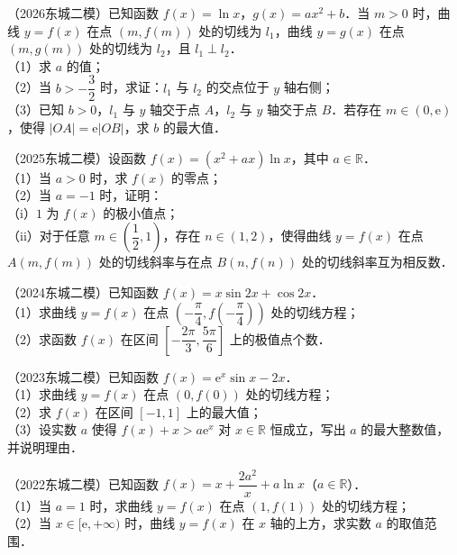 \begin{example}
（2026东城二模）已知函数 $f(x)=\ln x$，$g(x)=ax^2+b$．当 $m>0$ 时，曲线 $y=f(x)$ 在点 $(m,f(m))$ 处的切线为 $l_1$，曲线 $y=g(x)$ 在点 $(m,g(m))$ 处的切线为 $l_2$，且 $l_1\perp l_2$．\\
（1）求 $a$ 的值；\\
（2）当 $b>-\dfrac32$ 时，求证：$l_1$ 与 $l_2$ 的交点位于 $y$ 轴右侧；\\
（3）已知 $b>0$，$l_1$ 与 $y$ 轴交于点 $A$，$l_2$ 与 $y$ 轴交于点 $B$．若存在 $m\in(0,\mathrm{e})$，使得 $|OA|=\mathrm{e}|OB|$，求 $b$ 的最大值．
\end{example}

\begin{example}
（2025东城二模）设函数 $f(x)=(x^2+ax)\ln x$，其中 $a\in\mathbb{R}$．\\
（1）当 $a>0$ 时，求 $f(x)$ 的零点；\\
（2）当 $a=-1$ 时，证明：\\
（i）$1$ 为 $f(x)$ 的极小值点；\\
（ii）对于任意 $m\in\left(\dfrac12,1\right)$，存在 $n\in(1,2)$，使得曲线 $y=f(x)$ 在点 $A(m,f(m))$ 处的切线斜率与在点 $B(n,f(n))$ 处的切线斜率互为相反数．
\end{example}

\begin{example}
（2024东城二模）已知函数 $f(x)=x\sin2x+\cos2x$．\\
（1）求曲线 $y=f(x)$ 在点 $\left(-\dfrac\pi4,f\left(-\dfrac\pi4\right)\right)$ 处的切线方程；\\
（2）求函数 $f(x)$ 在区间 $\left[-\dfrac{2\pi}{3},\dfrac{5\pi}{6}\right]$ 上的极值点个数．
\end{example}

\begin{example}
（2023东城二模）已知函数 $f(x)=\mathrm{e}^x\sin x-2x$．\\
（1）求曲线 $y=f(x)$ 在点 $(0,f(0))$ 处的切线方程；\\
（2）求 $f(x)$ 在区间 $[-1,1]$ 上的最大值；\\
（3）设实数 $a$ 使得 $f(x)+x>a\mathrm{e}^x$ 对 $x\in\mathbb{R}$ 恒成立，写出 $a$ 的最大整数值，并说明理由．
\end{example}

\begin{example}
（2022东城二模）已知函数 $f(x)=x+\dfrac{2a^2}{x}+a\ln x$（$a\in\mathbb{R}$）．\\
（1）当 $a=1$ 时，求曲线 $y=f(x)$ 在点 $(1,f(1))$ 处的切线方程；\\
（2）当 $x\in[\mathrm{e},+\infty)$ 时，曲线 $y=f(x)$ 在 $x$ 轴的上方，求实数 $a$ 的取值范围．
\end{example}

